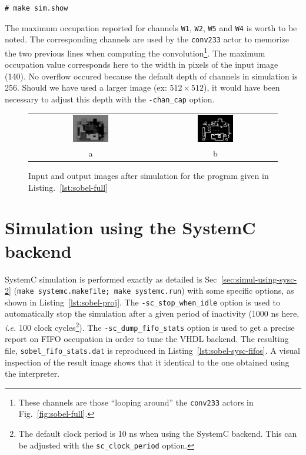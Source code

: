 \begin{lstlisting}[style=BashInputStyle]
# make sim.show
\end{lstlisting}

\medskip
The maximum occupation reported for channels \verb|W1|, \verb|W2|, \verb|W5| and \verb|W4| is worth
to be noted. The corresponding channels are used by the \verb|conv233| actor to memorize the two
previous lines when computing the convolution\footnote{These channels are those ``looping around''
  the \texttt{conv233} actors in Fig.~\ref{fig:sobel-full}.}. The maximum occupation value
corresponds here to the width in pixels of the input image (140). No overflow occured because the
default depth of channels in simulation is 256. Should we have used a larger image (ex: $512 \times
512$), it would have been necessary to adjust this depth with the \verb|-chan_cap| option.

\begin{figure}[htbp]
  \centering
  \begin{tabular}[c]{cc}
 \includegraphics[width=0.3\textwidth]{./figs/pcb.pdf} &
 \includegraphics[width=0.3\textwidth]{./figs/pcb-res.pdf} \\
 a & b
  \end{tabular}
  \caption{Input and output images after simulation for the program given in Listing.~\ref{lst:sobel-full}}
  \label{fig:sobel-result}
\end{figure}

\section{Simulation using the SystemC backend}

SystemC simulation is performed exactly as detailed is Sec~\ref{sec:simul-using-sysc-2} (\verb|make systemc.makefile; make systemc.run|) with some
specific options, as shown in Listing~\ref{lst:sobel-proj}. The \verb|-sc_stop_when_idle| option is used to automatically
stop the simulation after a given period of inactivity (1000 ns here, \emph{i.e.} 100 clock
cycles\footnote{The default clock period is 10 ns when using the SystemC backend. This can be
  adjusted with the \texttt{sc\_clock\_period} option.}). The \verb|-sc_dump_fifo_stats| option is
used to get a precise report on FIFO occupation in order to tune the VHDL backend. The resulting
file, \verb|sobel_fifo_stats.dat| is reproduced in Listing~\ref{lst:sobel-sysc-fifos}. 
A visual inspection of the result image shows that it identical to the one obtained using the
interpreter. 

